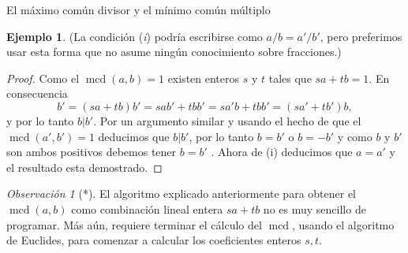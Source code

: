 \documentclass[11pt,spanish,makeidx]{amsbook}
\theoremstyle{definition}
\newtheorem{ejemplo}{Ejemplo}[section]
\theoremstyle{remark}
\newtheorem{observacion}{Observaci\'on}[section]
\newcommand \mcd{\operatorname{mcd}}
\begin{document}
\begin{section}{El máximo común divisor y el mínimo común múltiplo}
\begin{ejemplo}
(La condición ({\em i}) podría escribirse como $a/b=a'/b'$, pero preferimos usar esta forma que no asume ningún conocimiento sobre fracciones.)
\end{ejemplo}
\begin{proof} Como el $\mcd (a,b) =1$ existen enteros $s$ y $t$ tales que $sa+tb=1$. En consecuencia
$$
b'=(sa+tb)b' =sab'+tbb' = sa'b + tbb'=(sa'+tb')b,
$$
y por lo tanto $b|b'$. Por un argumento similar y usando el hecho de que el $\mcd(a',b')=1 $ deducimos que $b|b'$, por lo tanto $b=b'$ o $b=-b'$ y como $b $ y $b'$ son ambos positivos debemos tener $b=b'$ . Ahora de (i) deducimos que $a=a'$ y el resultado esta demostrado.
\end{proof}

\begin{observacion}[*]
El  algoritmo explicado anteriormente para obtener el $\mcd(a,b)$ como combinación lineal entera $sa+tb$ no es muy sencillo de programar. Más aún, requiere terminar el cálculo del $\mcd$, usando el algoritmo de Euclides, para comenzar a calcular los coeficientes enteros $s,t$. 


\end{observacion}
\end{section}
\end{document}
